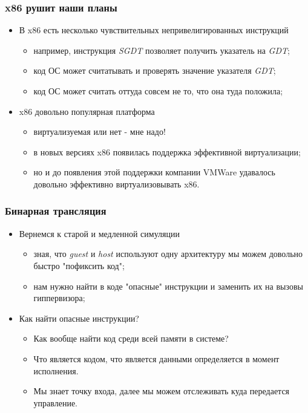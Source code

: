 \begin{frame}
\frametitle{x86 рушит наши планы}
\begin{itemize}
  \item<1-> В x86 есть несколько чувствительных непривелигированных инструкций
    \begin{itemize}
      \item например, инструкция \emph{SGDT} позволяет получить указатель на
            \emph{GDT};
      \item код ОС может считатывать и проверять значение указателя \emph{GDT};
      \item код ОС может считать оттуда совсем не то, что она туда положила;
    \end{itemize}
  \item<2-> x86 довольно популярная платформа
    \begin{itemize}
      \item виртуализуемая или нет - мне надо!
      \item в новых версиях x86 появилась поддержка эффективной виртуализации;
      \item но и до появления этой поддержки компании VMWare удавалось довольно
            эффективно виртуализовывать x86.
    \end{itemize}
\end{itemize}
\end{frame}

\begin{frame}
\frametitle{Бинарная трансляция}
\begin{itemize}
  \item<1-> Вернемся к старой и медленной симуляции
    \begin{itemize}
      \item зная, что \emph{guest} и \emph{host} используют одну архитектуру
            мы можем довольно быстро "пофиксить код";
      \item нам нужно найти в коде "опасные" инструкции и заменить их на вызовы
            гиппервизора;
    \end{itemize}
  \item<2-> Как найти опасные инструкции?
    \begin{itemize}
      \item Как вообще найти код среди всей памяти в системе?
      \item Что является кодом, что является данными определяется в момент
            исполнения.
      \item Мы знает точку входа, далее мы можем отслеживать куда передается
            управление.
    \end{itemize}
\end{itemize}
\end{frame}

